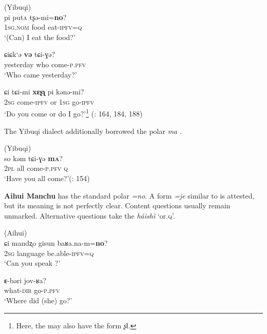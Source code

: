 \newpage
\ea%
    \label{ex:tungu:72}
     (Yibuqi)\\
    \ea
    \gll pi    put\textsc{a} tʂə-mi=\textbf{{no}}?\\
    1\textsc{sg.nom}  food  eat-\textsc{ipfv}=\textsc{q}\\
    \glt ‘(Can) I eat the food?’
    
    \ex
    \gll ɕiɕk‘ə \textbf{{və}} tɕi-ɣə?\\
    yesterday  who  come-\textsc{p.pfv}\\
    \glt ‘Who came yesterday?’
    
    \ex
    \gll ɕi  tɕi-mi \textbf{{xɛʂʅ}} pi    kənə-mi?\\
    2\textsc{sg}  come-\textsc{ipfv}  or  1\textsc{sg}  go-\textsc{ipfv}\\
    \glt ‘Do you come or do I go?’\footnote{Here, the  may also have the form \textit{ʂʅ}.} (\citealt{ZhaoJie1989}: 164, 184, 188)\z\z

The Yibuqi dialect additionally borrowed the  polar  \textit{ma} .

\ea%
    \label{ex:tungu:73}
     (Yibuqi)\\
    \gll so  kəm  tɕi-ɣə \textbf{{m}}\textbf{\textsc{a}}?\\
    2\textsc{pl}  all  come-\textsc{p.pfv}  \textsc{q}\\
    \glt ‘Have you all come?’(\citealt{ZhaoJie1989}: 154)
    \z

\textbf{Aihui Manchu} has the standard polar  \textit{=no}. A form \textit{=je} similar to  is attested, but its meaning is not perfectly clear. Content questions usually remain unmarked. Alternative questions take the   \textit{háishì}  ‘or.\textsc{q}’.

\ea%
    \label{ex:tungu:74}
     (Aihui)\\
    \ea
    \gll ɕi  mandʐo  gisun    baʁa.na-m=\textbf{{no}}?\\
    2\textsc{sg}    language  be.able-\textsc{ipfv}=\textsc{q}\\
    \glt ‘Can you speak ?’
    
    \ex
    \gll \textbf{{ɛ}}-bəri    jov-ʁa?\\
    what-\textsc{dir}  go-\textsc{p.pfv}\\
    \glt ‘Where did (she) go?’
    

